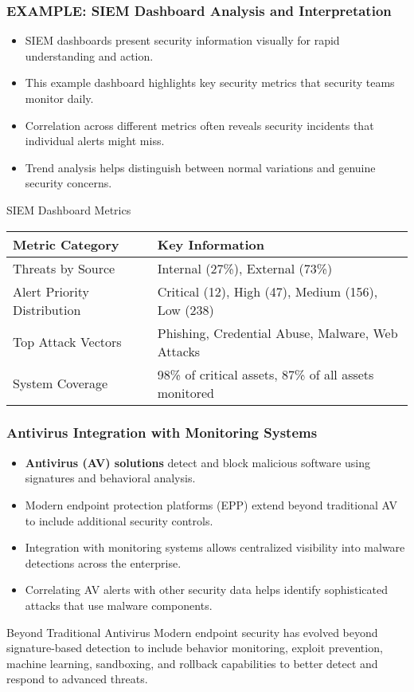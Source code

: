 \documentclass{beamer}
\begin{document}
\begin{frame}
    \frametitle{EXAMPLE: SIEM Dashboard Analysis and Interpretation}
    \begin{itemize}
    \item SIEM dashboards present security information visually for rapid understanding and action.
    \item This example dashboard highlights key security metrics that security teams monitor daily.
    \item Correlation across different metrics often reveals security incidents that individual alerts might miss.
    \item Trend analysis helps distinguish between normal variations and genuine security concerns.
    \end{itemize}
    
    \begin{exampleblock}{SIEM Dashboard Metrics}
    \small
    \begin{tabular}{ll}
    \toprule
    \textbf{Metric Category} & \textbf{Key Information} \\
    \midrule
    Threats by Source & Internal (27\%), External (73\%) \\
    Alert Priority Distribution & Critical (12), High (47), Medium (156), Low (238) \\
    Top Attack Vectors & Phishing, Credential Abuse, Malware, Web Attacks \\
    System Coverage & 98\% of critical assets, 87\% of all assets monitored \\
    \bottomrule
    \end{tabular}
    \end{exampleblock}
    \end{frame}


\begin{frame}
\frametitle{Antivirus Integration with Monitoring Systems}
\begin{itemize}
\item \textbf{Antivirus (AV) solutions} detect and block malicious software using signatures and behavioral analysis.
\item Modern endpoint protection platforms (EPP) extend beyond traditional AV to include additional security controls.
\item Integration with monitoring systems allows centralized visibility into malware detections across the enterprise.
\item Correlating AV alerts with other security data helps identify sophisticated attacks that use malware components.
\end{itemize}

\begin{alertblock}{Beyond Traditional Antivirus}
    \scriptsize
Modern endpoint security has evolved beyond signature-based detection to include behavior monitoring, exploit prevention, machine learning, sandboxing, and rollback capabilities to better detect and respond to advanced threats.
\end{alertblock}
\end{frame}
\end{document}
